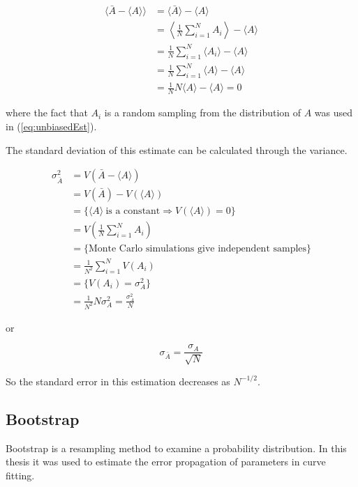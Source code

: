 \begin{align}
    \langle \bar A - \langle A \rangle \rangle &= \langle \bar A \rangle - \langle A \rangle \\
%
    &= \left \langle \frac{1}{N} \sum_{i = 1}^{N} A_i \right \rangle - \langle A \rangle \\
%
    &= \frac{1}{N} \sum_{i = 1}^{N} \langle A_i \rangle - \langle A \rangle \\
\label{eq:unbiasedEst}
%
    &= \frac{1}{N} \sum_{i = 1}^{N} \langle A \rangle - \langle A \rangle \\
%
    &= \frac{1}{N} N \langle A \rangle - \langle A \rangle = 0
\end{align}

where the fact that $A_i$ is a random sampling from the distribution of $A$ was used in (\ref{eq:unbiasedEst}).

The standard deviation of this estimate can be calculated through the variance.

\begin{align}
    \sigma_{\bar A}^{2} &= V\left( \bar A - \langle A \rangle \right ) \\
%
    &= V\left(\bar A\right) - V\left(\langle A \rangle\right) \\
%
    &= \{ \langle A \rangle \ \text{is a constant} \Rightarrow V(\langle A \rangle) = 0 \} \\
%
    &= V \left ( \frac{1}{N} \sum_{i = 1}^{N} A_i \right ) \\
%
    &= \{ \text{Monte Carlo simulations give independent samples} \} \\
%
    &= \frac{1}{N^2} \sum_{i = 1}^{N} V(A_i) \\
%
    &= \{ V(A_i) = \sigma_{A}^2 \} \\
%
    &= \frac{1}{N^2} N \sigma_{A}^2 = \frac{\sigma_{A}^2}{N}
\end{align}

or

\begin{equation}
    \sigma_{\bar A} = \frac{\sigma_A}{\sqrt{N}}
\end{equation}

So the standard error in this estimation decreases as $N^{-1/2}$.

\subsection{Bootstrap}
\label{subsec:Bootstrap}

Bootstrap is a resampling method to examine a probability distribution. In this thesis it was used to estimate the error propagation of parameters in curve fitting.

